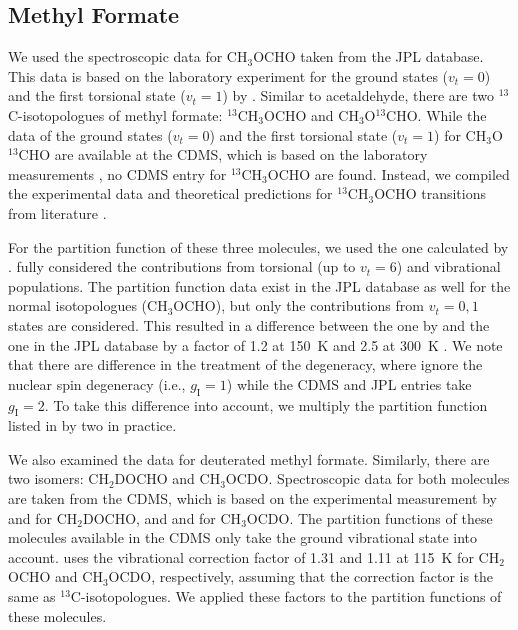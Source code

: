 \documentclass[twocolumn, twocolappendix, astrosymb, times]{aastex631}
\newcommand{\methylformate}{CH$_3$OCHO\xspace}
\begin{document}
\subsection{Methyl Formate}
We used the spectroscopic data for \methylformate taken from the JPL database. This data is based on the laboratory experiment for the ground states ($v_t = 0$) and the first torsional state ($v_t = 1$) by \citet{Ilyushin2009}. Similar to acetaldehyde, there are two $^{13}$C-isotopologues of methyl formate: $^{13}$CH$_3$OCHO and CH$_3$O$^{13}$CHO. While the data of the ground states ($v_t = 0$) and the first torsional state ($v_t = 1$) for CH$_3$O$^{13}$CHO are available at the CDMS, which is based on the laboratory measurements \citep[][and references therein]{Carvajal2010}, no CDMS entry for $^{13}$CH$_3$OCHO are found. Instead, we compiled the experimental data and theoretical predictions for $^{13}$CH$_3$OCHO transitions from literature \citep{Carvajal2009, Haykal2014, Favre2014}. 

For the partition function of these three molecules, we used the one calculated by \citet{Favre2014}. \citet{Favre2014} fully considered the contributions from torsional (up to $v_t=6$) and vibrational populations. The partition function data exist in the JPL database as well for the normal isotopologues (\methylformate), but only the contributions from $v_t = 0, 1$ states are considered. This resulted in a difference between the one by \citet{Favre2014} and the one in the JPL database by a factor of 1.2 at 150~K and 2.5 at 300~K \citep{Favre2014}. We note that there are difference in the treatment of the degeneracy, where \citet{Favre2014} ignore the nuclear spin degeneracy (i.e., $g_\mathrm{I} = 1$) while the CDMS and JPL entries take $g_\mathrm{I} = 2$. To take this difference into account, we multiply the partition function listed in \citet{Favre2014} by two in practice.

We also examined the data for deuterated methyl formate. Similarly, there are two isomers: CH$_2$DOCHO and CH$_3$OCDO. Spectroscopic data for both molecules are taken from the CDMS, which is based on the experimental measurement by \citet{Coudert2013} and \citet{Margules2009} for CH$_2$DOCHO, and \citet{Margules2010} and \citet{Duan2015} for CH$_3$OCDO. The partition functions of these molecules available in the CDMS only take the ground vibrational state into account. 
\citet{Manigand2019} uses the vibrational correction factor of 1.31 and 1.11 at 115~K for CH$_2$OCHO and CH$_3$OCDO, respectively, assuming that the correction factor is the same as $^{13}$C-isotopologues. We applied these factors to the partition functions of these molecules.
\end{document}
